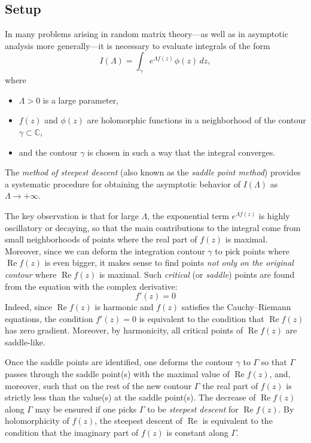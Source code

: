 \documentclass[letterpaper,11pt,oneside,reqno]{article}
\numberwithin{equation}{section}
\newcommand{\ssp}{\hspace{1pt}}
\theoremstyle{definition}
\begin{document}
\subsection{Setup}

In many problems arising in random matrix theory—as well as in asymptotic analysis more generally—it is necessary to evaluate integrals of the form
\begin{equation}
	\label{eq:general-integral}
	I(\Lambda)=\int_{\gamma} e^{\Lambda f(z)}\ssp \phi(z)\,dz,
\end{equation}
where
\begin{itemize}
	\item $\Lambda>0$ is a large parameter,
	\item $f(z)$ and $\phi(z)$ are holomorphic functions in a neighborhood of the contour $\gamma\subset\mathbb{C}$,
	\item and the contour $\gamma$ is chosen in such a way that the integral converges.
\end{itemize}
The \emph{method of steepest descent} (also known as the \emph{saddle point method}) provides a systematic procedure for obtaining the asymptotic behavior of $I(\Lambda)$ as $\Lambda\to+\infty$.

The key observation is that for large $\Lambda$, the
exponential term $e^{\Lambda f(z)}$ is highly oscillatory or
decaying, so that the main contributions to the integral
come from small neighborhoods of points where the real part
of $f(z)$ is maximal.
Moreover, since we can deform the integration contour $\gamma$
to pick points where $\operatorname{Re}f(z)$ is even bigger, it makes sense to find
points \emph{not only on the original contour}
where $\operatorname{Re}f(z)$ is maximal.
Such \emph{critical} (or \emph{saddle}) points are
found from the equation with the complex derivative:
\begin{equation*}
	f'(z)=0
\end{equation*}
Indeed, since $\operatorname{Re}f(z)$
is harmonic and $f(z)$ satisfies the Cauchy--Riemann equations,
the condition $f'(z)=0$ is equivalent to the condition that $\operatorname{Re}f(z)$
has zero gradient. Moreover, by harmonicity, all critical points of
$\operatorname{Re}f(z)$ are saddle-like.

Once the saddle points are identified, one deforms the
contour $\gamma$ to $\Gamma$ so that $\Gamma$ passes
through the saddle point(s)
with the maximal value of $\operatorname{Re}f(z)$, and, moreover,
such that on the rest of the new contour $\Gamma$ the
real part of $f(z)$ is strictly less than the value(s) at the saddle point(s).
The decrease of $\operatorname{Re}f(z)$ along $\Gamma$ may be ensured
if one picks $\Gamma$ to be \emph{steepest descent} for $\operatorname{Re}f(z)$.
By holomorphicity of $f(z)$, the steepest descent
of $\operatorname{Re}$ is equivalent to the condition that
the imaginary part of $f(z)$ is constant along $\Gamma$.
\end{document}
